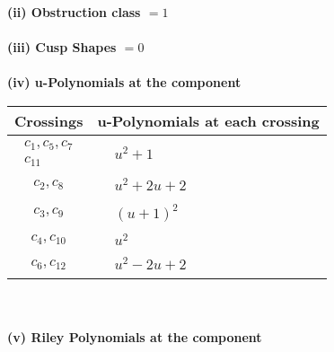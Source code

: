 \documentclass[1p]{elsarticle_modified}
\theoremstyle{definition}
\begin{document}
\flushleft \textbf{(ii) Obstruction class $= 1$}\\~\\
\flushleft \textbf{(iii) Cusp Shapes $= 0$}\\~\\
\newpage\renewcommand{\arraystretch}{1}
\flushleft \textbf{(iv) u-Polynomials at the component}\newline \\
\begin{tabular}{m{50pt}|m{274pt}}
Crossings & \hspace{64pt}u-Polynomials at each crossing \\
\hline $$\begin{aligned}c_{1},c_{5},c_{7}\\c_{11}\end{aligned}$$&$\begin{aligned}
&u^2+1
\end{aligned}$\\
\hline $$\begin{aligned}c_{2},c_{8}\end{aligned}$$&$\begin{aligned}
&u^2+2 u+2
\end{aligned}$\\
\hline $$\begin{aligned}c_{3},c_{9}\end{aligned}$$&$\begin{aligned}
&(u+1)^2
\end{aligned}$\\
\hline $$\begin{aligned}c_{4},c_{10}\end{aligned}$$&$\begin{aligned}
&u^2
\end{aligned}$\\
\hline $$\begin{aligned}c_{6},c_{12}\end{aligned}$$&$\begin{aligned}
&u^2-2 u+2
\end{aligned}$\\
\hline
\end{tabular}\\~\\
\newpage\renewcommand{\arraystretch}{1}
\flushleft \textbf{(v) Riley Polynomials at the component}\newline \\
\end{document}
